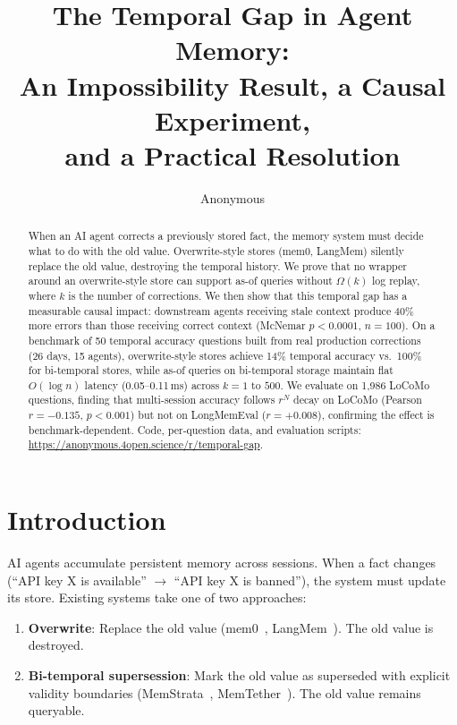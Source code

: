 \documentclass{article}
\title{The Temporal Gap in Agent Memory:\\An Impossibility Result, a Causal Experiment,\\and a Practical Resolution}
\author{Anonymous}
\date{}
\begin{document}
\maketitle

\begin{abstract}
When an AI agent corrects a previously stored fact, the memory system must decide what to do with the old value. Overwrite-style stores (mem0, LangMem) silently replace the old value, destroying the temporal history. We prove that no wrapper around an overwrite-style store can support as-of queries without $\Omega(k)$ log replay, where $k$ is the number of corrections. We then show that this temporal gap has a measurable causal impact: downstream agents receiving stale context produce 40\% more errors than those receiving correct context (McNemar $p < 0.0001$, $n{=}100$). On a benchmark of 50 temporal accuracy questions built from real production corrections (26 days, 15 agents), overwrite-style stores achieve 14\% temporal accuracy vs.\ 100\% for bi-temporal stores, while as-of queries on bi-temporal storage maintain flat $O(\log n)$ latency (0.05--0.11\,ms) across $k{=}1$ to $500$. We evaluate on 1{,}986 LoCoMo questions, finding that multi-session accuracy follows $r^N$ decay on LoCoMo (Pearson $r = -0.135$, $p < 0.001$) but not on LongMemEval ($r = +0.008$), confirming the effect is benchmark-dependent. Code, per-question data, and evaluation scripts: \url{https://anonymous.4open.science/r/temporal-gap}.
\end{abstract}

\section{Introduction}
\label{sec:intro}

AI agents accumulate persistent memory across sessions. When a fact changes (``API key X is available'' $\to$ ``API key X is banned''), the system must update its store. Existing systems take one of two approaches:

\begin{enumerate}
\item \textbf{Overwrite}: Replace the old value (mem0~\citep{mem0}, LangMem~\citep{langmem}). The old value is destroyed.
\item \textbf{Bi-temporal supersession}: Mark the old value as superseded with explicit validity boundaries (MemStrata~\citep{memstrata}, MemTether~\citep{memtether}). The old value remains queryable.
\end{enumerate}
\end{document}

